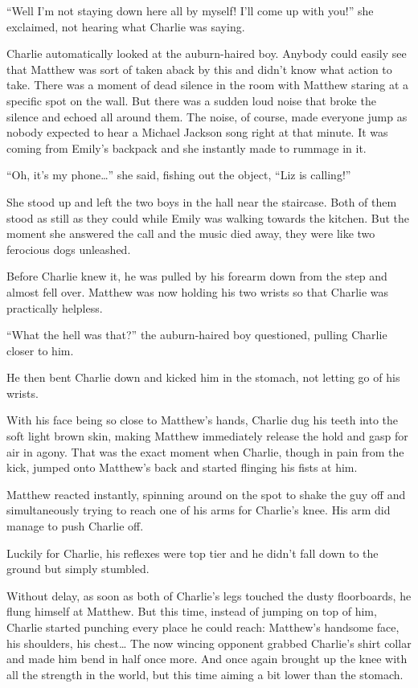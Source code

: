 “Well I’m not staying down here all by myself! I’ll come up with you!” she exclaimed, not hearing what Charlie was saying.

Charlie automatically looked at the auburn-haired boy. Anybody could easily see that Matthew was sort of taken aback by this and didn’t know what action to take. There was a moment of dead silence in the room with Matthew staring at a specific spot on the wall. But there was a sudden loud noise that broke the silence and echoed all around them. The noise, of course, made everyone jump as nobody expected to hear a Michael Jackson song right at that minute. It was coming from Emily’s backpack and she instantly made to rummage in it.

“Oh, it’s my phone…” she said, fishing out the object, “Liz is calling!”

She stood up and left the two boys in the hall near the staircase. Both of them stood as still as they could while Emily was walking towards the kitchen. But the moment she answered the call and the music died away, they were like two ferocious dogs unleashed.

Before Charlie knew it, he was pulled by his forearm down from the step and almost fell over. Matthew was now holding his two wrists so that Charlie was practically helpless.

“What the hell was that?” the auburn-haired boy questioned, pulling Charlie closer to him.

He then bent Charlie down and kicked him in the stomach, not letting go of his wrists.

With his face being so close to Matthew’s hands, Charlie dug his teeth into the soft light brown skin, making Matthew immediately release the hold and gasp for air in agony. That was the exact moment when Charlie, though in pain from the kick, jumped onto Matthew’s back and started flinging his fists at him.

Matthew reacted instantly, spinning around on the spot to shake the guy off and simultaneously trying to reach one of his arms for Charlie’s knee. His arm did manage to push Charlie off.

Luckily for Charlie, his reflexes were top tier and he didn’t fall down to the ground but simply stumbled.

Without delay, as soon as both of Charlie’s legs touched the dusty floorboards, he flung himself at Matthew. But this time, instead of jumping on top of him, Charlie started punching every place he could reach: Matthew’s handsome face, his shoulders, his chest… The now wincing opponent grabbed Charlie’s shirt collar and made him bend in half once more. And once again brought up the knee with all the strength in the world, but this time aiming a bit lower than the stomach.

